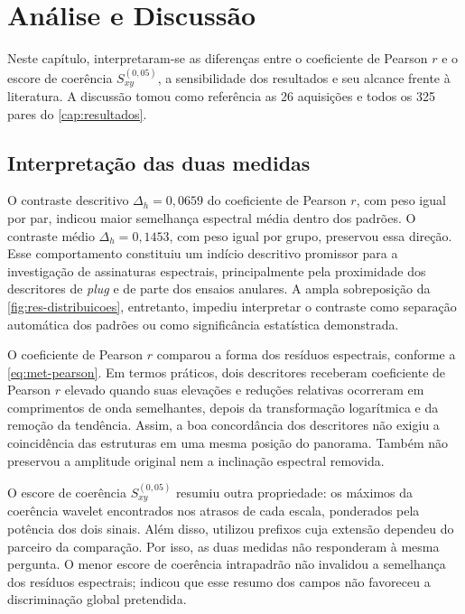 \chapter{Análise e Discussão}\label{cap:discussao}

Neste capítulo, interpretaram-se as diferenças entre o coeficiente de Pearson $r$
e o escore de coerência $S_{xy}^{(0{,}05)}$, a sensibilidade dos resultados e
seu alcance frente à literatura. A discussão tomou como referência as 26 aquisições
e todos os 325 pares do \autoref{cap:resultados}.

\section{Interpretação das duas medidas}\label{sec:disc-interpretacao}

O contraste descritivo $\Delta_h=0{,}0659$ do coeficiente de Pearson $r$, com peso igual
por par, indicou maior semelhança espectral média dentro dos padrões. O contraste
médio $\Delta_h=0{,}1453$, com peso igual por grupo, preservou essa direção.
Esse comportamento constituiu um indício descritivo promissor para a investigação
de assinaturas espectrais, principalmente pela proximidade dos descritores de
\textit{plug} e de parte dos ensaios anulares. A ampla sobreposição da
\autoref{fig:res-distribuicoes}, entretanto, impediu interpretar o contraste
como separação automática dos padrões ou como significância estatística demonstrada.

O coeficiente de Pearson $r$ comparou a forma dos resíduos espectrais, conforme
a \autoref{eq:met-pearson}. Em termos práticos, dois descritores receberam
coeficiente de Pearson $r$ elevado quando suas elevações e reduções relativas
ocorreram em comprimentos de onda semelhantes, depois da transformação logarítmica
e da remoção da tendência. Assim, a boa concordância dos descritores não exigiu
a coincidência das estruturas em uma mesma posição do panorama. Também não
preservou a amplitude original nem a inclinação espectral removida.

O escore de coerência $S_{xy}^{(0{,}05)}$ resumiu outra propriedade: os máximos
da coerência wavelet encontrados nos atrasos de cada escala, ponderados pela potência
dos dois sinais. Além disso, utilizou prefixos cuja extensão dependeu do parceiro
da comparação. Por isso, as duas medidas não responderam à mesma pergunta.
O menor escore de coerência intrapadrão não invalidou a semelhança dos resíduos
espectrais; indicou que esse resumo dos campos não favoreceu a discriminação
global pretendida.

